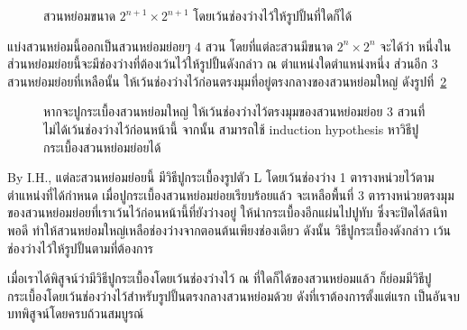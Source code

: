 \begin{theorem}
\begin{pf}
\begin{itemize}
\begin{figure}
\caption{สวนหย่อมขนาด $2^{n+1}\times 2^{n+1}$ โดยเว้นช่องว่างไว้ให้รูปปั้นที่ใดก็ได้}
\label{fig:courtyard-n+1-general}
\end{figure}
%
\enskip แบ่งสวนหย่อมนี้ออกเป็นสวนหย่อมย่อยๆ 4 สวน โดยที่แต่ละสวนมีขนาด $2^n\times 2^n$ จะได้ว่า หนึ่งในส่วนหย่อมย่อยนี้จะมีช่องว่างที่ต้องเว้นไว้ให้รูปปั้นดังกล่าว ณ ตำแหน่งใดตำแหน่งหนึ่ง ส่วนอีก 3 สวนหย่อมย่อยที่เหลือนั้น ให้เว้นช่องว่างไว้ก่อนตรงมุมที่อยู่ตรงกลางของสวนหย่อมใหญ่ ดังรูปที่~\ref{fig:courtyard-n+1-inductive}
%
\begin{figure}
\centering
{}
\caption[วิธีการปูกระเบื้องบนสวนหย่อมใหญ่]{หากจะปูกระเบื้องสวนหย่อมใหญ่ ให้เว้นช่องว่างไว้ตรงมุมของสวนหย่อมย่อย 3 สวนที่ไม่ได้เว้นช่องว่างไว้ก่อนหน้านี้ จากนั้น สามารถใช้ induction hypothesis หาวิธีปูกระเบื้องสวนหย่อมย่อยได้}
\label{fig:courtyard-n+1-inductive}
\end{figure}
%
\enskip By I.H., แต่ละสวนหย่อมย่อยนี้ มีวิธีปูกระเบื้องรูปตัว L โดยเว้นช่องว่าง 1 ตารางหน่วยไว้ตามตำแหน่งที่ได้กำหนด \enskip เมื่อปูกระเบื้องสวนหย่อมย่อยเรียบร้อยแล้ว จะเหลือพื้นที่ 3 ตารางหน่วยตรงมุมของสวนหย่อมย่อยที่เราเว้นไว้ก่อนหน้านี้ที่ยังว่างอยู่ ให้นำกระเบื้องอีกแผ่นไปปูทับ ซึ่งจะปิดได้สนิทพอดี ทำให้สวนหย่อมใหญ่เหลือช่องว่างจากตอนต้นเพียงช่องเดียว ดังนั้น วิธีปูกระเบื้องดังกล่าว เว้นช่องว่างไว้ให้รูปปั้นตามที่ต้องการ
\end{itemize}

เมื่อเราได้พิสูจน์ว่ามีวิธีปูกระเบื้องโดยเว้นช่องว่างไว้ ณ ที่ใดก็ได้ของสวนหย่อมแล้ว ก็ย่อมมีวิธีปูกระเบื้องโดยเว้นช่องว่างไว้สำหรับรูปปั้นตรงกลางสวนหย่อมด้วย ดังที่เราต้องการตั้งแต่แรก เป็นอันจบบทพิสูจน์โดยครบถ้วนสมบูรณ์
\end{pf}
\end{theorem}

